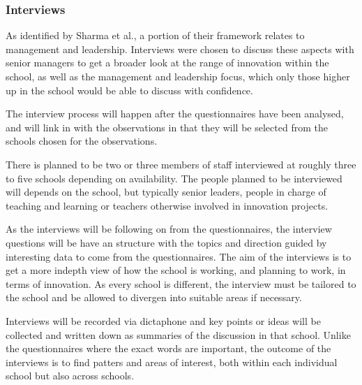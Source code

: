 \subsubsection{Interviews}
As identified by Sharma et al., a portion of their framework relates to management and leadership. Interviews were chosen to discuss these aspects with senior managers to get a broader look at the range of innovation within the school, as well as the management and leadership focus, which only those higher up in the school would be able to discuss with confidence.

The interview process will happen after the questionnaires have been analysed, and will link in with the observations in that they will be selected from the schools chosen for the observations.

There is planned to be two or three members of staff interviewed at roughly three to five schools depending on availability. The people planned to be interviewed will depends on the school, but typically senior leaders, people in charge of teaching and learning or teachers otherwise involved in innovation projects.

As the interviews will be following on from the questionnaires, the interview questions will be have an structure with the topics and direction guided by interesting data to come from the questionnaires. The aim of the interviews is to get a more indepth view of how the school is working, and planning to work, in terms of innovation. As every school is different, the interview must be tailored to the school and be allowed to divergen into suitable areas if necessary. 

Interviews will be recorded via dictaphone and key points or ideas will be collected and written down as summaries of the discussion in that school. Unlike the questionnaires where the exact words are important, the outcome of the interviews is to find patters and areas of interest, both within each individual school but also across schools.

